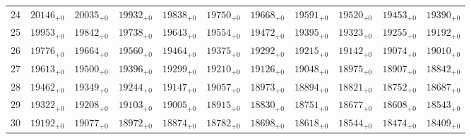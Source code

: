 \documentclass[10pt, a4paper]{article}
\begin{document}
\begin{center}
\begin{tabular}{c || c c c c c | c c c c c}
        24 & \({20146}_{+0}\) & \({20035}_{+0}\) & \({19932}_{+0}\) & \({19838}_{+0}\) & \({19750}_{+0}\) & \({19668}_{+0}\) & \({19591}_{+0}\) & \({19520}_{+0}\) & \({19453}_{+0}\) & \({19390}_{+0}\)\\
        25 & \({19953}_{+0}\) & \({19842}_{+0}\) & \({19738}_{+0}\) & \({19643}_{+0}\) & \({19554}_{+0}\) & \({19472}_{+0}\) & \({19395}_{+0}\) & \({19323}_{+0}\) & \({19255}_{+0}\) & \({19192}_{+0}\)\\
        \hline
        26 & \({19776}_{+0}\) & \({19664}_{+0}\) & \({19560}_{+0}\) & \({19464}_{+0}\) & \({19375}_{+0}\) & \({19292}_{+0}\) & \({19215}_{+0}\) & \({19142}_{+0}\) & \({19074}_{+0}\) & \({19010}_{+0}\)\\
        27 & \({19613}_{+0}\) & \({19500}_{+0}\) & \({19396}_{+0}\) & \({19299}_{+0}\) & \({19210}_{+0}\) & \({19126}_{+0}\) & \({19048}_{+0}\) & \({18975}_{+0}\) & \({18907}_{+0}\) & \({18842}_{+0}\)\\
        28 & \({19462}_{+0}\) & \({19349}_{+0}\) & \({19244}_{+0}\) & \({19147}_{+0}\) & \({19057}_{+0}\) & \({18973}_{+0}\) & \({18894}_{+0}\) & \({18821}_{+0}\) & \({18752}_{+0}\) & \({18687}_{+0}\)\\
        29 & \({19322}_{+0}\) & \({19208}_{+0}\) & \({19103}_{+0}\) & \({19005}_{+0}\) & \({18915}_{+0}\) & \({18830}_{+0}\) & \({18751}_{+0}\) & \({18677}_{+0}\) & \({18608}_{+0}\) & \({18543}_{+0}\)\\
        30 & \({19192}_{+0}\) & \({19077}_{+0}\) & \({18972}_{+0}\) & \({18874}_{+0}\) & \({18782}_{+0}\) & \({18698}_{+0}\) & \({18618}_{+0}\) & \({18544}_{+0}\) & \({18474}_{+0}\) & \({18409}_{+0}\)\\
        \hline
    \end{tabular}
\end{center}
\pagebreak
\end{document}
